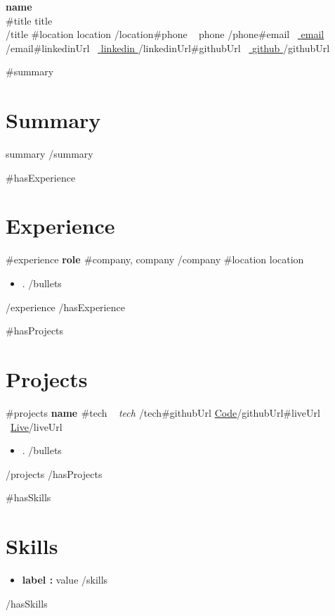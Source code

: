 \documentclass[letterpaper,11pt]{article}
\begin{document}
{\Huge\bfseries {{ name }}}\\[3pt]
{{#title}}{\large\color{accent} {{ title }}}\\[4pt]{{/title}}
{\small
{{#location}}{{ location }}{{/location}}{{#phone}} \textbar\ {{ phone }}{{/phone}}{{#email}} \textbar\ \href{mailto:{{{ email }}}}{ {{ email }} }{{/email}}{{#linkedinUrl}} \textbar\ \href{ {{{ linkedinUrl }}} }{ {{ linkedin }} }{{/linkedinUrl}}{{#githubUrl}} \textbar\ \href{ {{{ githubUrl }}} }{ {{ github }} }{{/githubUrl}}
}

{{#summary}}
\section{Summary}
{{ summary }}
{{/summary}}

{{#hasExperience}}
\section{Experience}
{{#experience}}
\textbf{ {{ role }} }{{#company}}, {{ company }}{{/company}} \hfill {{#location}}{{ location }} 
\begin{itemize}
{{#bullets}}\item {{ . }}
{{/bullets}}\end{itemize}
{{/experience}}
{{/hasExperience}}

{{#hasProjects}}
\section{Projects}
{{#projects}}
\textbf{ {{ name }} }{{#tech}} \textbar\ \textit{ {{ tech }} }{{/tech}}{{#githubUrl}} \hfill \href{ {{{ githubUrl }}} }{\color{accent}Code}{{/githubUrl}}{{#liveUrl}} \textbar\ \href{ {{{ liveUrl }}} }{\color{accent}Live}{{/liveUrl}}
\begin{itemize}
{{#bullets}}\item {{ . }}
{{/bullets}}\end{itemize}
{{/projects}}
{{/hasProjects}}

{{#hasSkills}}
\section{Skills}
\begin{itemize}[label={}, leftmargin=0pt]
{{#skills}}\item \textbf{ {{ label }}:} {{ value }}
{{/skills}}\end{itemize}
{{/hasSkills}}
\end{document}
